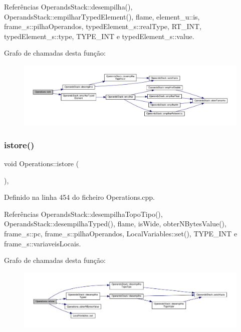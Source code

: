 Referências Operands\+Stack\+::desempilha(), Operands\+Stack\+::empilhar\+Typed\+Element(), flame, element\+\_\+u\+::is, frame\+\_\+s\+::pilha\+Operandos, typed\+Element\+\_\+s\+::real\+Type, R\+T\+\_\+\+I\+NT, typed\+Element\+\_\+s\+::type, T\+Y\+P\+E\+\_\+\+I\+NT e typed\+Element\+\_\+s\+::value.

Grafo de chamadas desta função\+:
\nopagebreak
\begin{figure}[H]
\begin{center}
\leavevmode
\includegraphics[width=350pt]{classOperations_aa67d92582121939b307658d417b34d3c_cgraph}
\end{center}
\end{figure}
\mbox{\label{classOperations_a1547cbd0fa84e551f218d472a5187efa}} 
\subsubsection{\texorpdfstring{istore()}{istore()}}
{\footnotesize\ttfamily void Operations\+::istore (\begin{DoxyParamCaption}{ }\end{DoxyParamCaption})\hspace{0.3cm}{\ttfamily [static]}, {\ttfamily [private]}}



Definido na linha 454 do ficheiro Operations.\+cpp.



Referências Operands\+Stack\+::desempilha\+Topo\+Tipo(), Operands\+Stack\+::desempilha\+Typed(), flame, is\+Wide, obter\+N\+Bytes\+Value(), frame\+\_\+s\+::pc, frame\+\_\+s\+::pilha\+Operandos, Local\+Variables\+::set(), T\+Y\+P\+E\+\_\+\+I\+NT e frame\+\_\+s\+::variaveis\+Locais.

Grafo de chamadas desta função\+:
\nopagebreak
\begin{figure}[H]
\begin{center}
\leavevmode
\includegraphics[width=350pt]{classOperations_a1547cbd0fa84e551f218d472a5187efa_cgraph}
\end{center}
\end{figure}
\mbox{\label{classOperations_ae0a17c510b570467f5b025e3dcbe1398}} 
